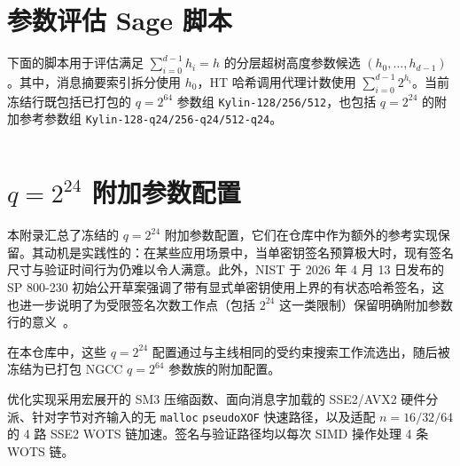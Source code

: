 \section{参数评估 Sage 脚本}
\label{apx:script}
下面的脚本用于评估满足 $\sum_{i=0}^{d-1} h_i = h$ 的分层超树高度参数候选 $(h_0,\ldots,h_{d-1})$。其中，消息摘要索引拆分使用 $h_0$，HT 哈希调用代理计数使用 $\sum_{i=0}^{d-1} 2^{h_i}$。当前冻结行既包括已打包的 $q=2^{64}$ 参数组 \texttt{Kylin-128/256/512}，也包括 $q=2^{24}$ 的附加参考参数组 \texttt{Kylin-128-q24/256-q24/512-q24}。
\inputminted[breaklines,tabsize=4,fontsize=\scriptsize]{python}{paper/code/para.sage}

\section{\texorpdfstring{$q=2^{24}$}{q equals 2 to the 24} 附加参数配置}
\label{apx:q24-profiles}

本附录汇总了冻结的 $q=2^{24}$ 附加参数配置，它们在仓库中作为额外的参考实现保留。其动机是实践性的：在某些应用场景中，当单密钥签名预算极大时，现有签名尺寸与验证时间行为仍难以令人满意。此外，NIST 于 2026 年 4 月 13 日发布的 SP 800-230 初始公开草案强调了带有显式单密钥使用上界的有状态哈希签名，这也进一步说明了为受限签名次数工作点（包括 $2^{24}$ 这一类限制）保留明确附加参数行的意义~\cite{NIST:SP800-230-IPD}。

在本仓库中，这些 $q=2^{24}$ 配置通过与主线相同的受约束搜索工作流选出，随后被冻结为已打包 NGCC $q=2^{64}$ 参数族的附加配置。

\begin{table}[htbp]
    \centering
    \caption{冻结的 $q=2^{24}$ Kylin 附加参数配置（额外实现）。}
    \label{tab:q24-parameters}
    \scriptsize
\end{table}

优化实现采用宏展开的 SM3 压缩函数、面向消息字加载的 SSE2/AVX2 硬件分派、针对字节对齐输入的无 \texttt{malloc} \texttt{pseudoXOF} 快速路径，以及适配 $n=16/32/64$ 的 4 路 SSE2 WOTS 链加速。签名与验证路径均以每次 SIMD 操作处理 4 条 WOTS 链。
